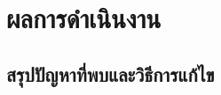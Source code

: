 \documentclass[12pt,oneside,openright,a4paper]{cpe-thai-project}
\begin{document}
\chapter{ผลการดําเนินงาน}
\section{ สรุปปัญหาที่พบและวิธีการแก้ไข}


\makeatletter
\g@addto@macro{\UrlBreaks}{\UrlOrds}
\makeatother







\end{document}
